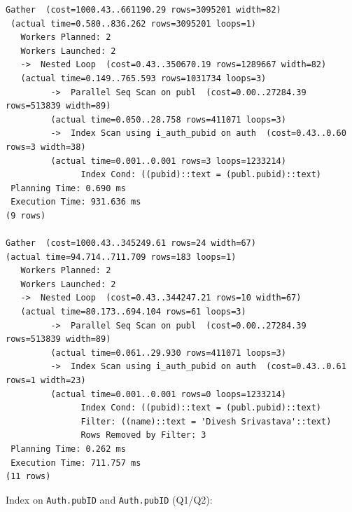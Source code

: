 \documentclass[11pt]{scrartcl}
\begin{document}
{\small
\parskip0pt\begin{verbatim}
Gather  (cost=1000.43..661190.29 rows=3095201 width=82) 
 (actual time=0.580..836.262 rows=3095201 loops=1)
   Workers Planned: 2
   Workers Launched: 2
   ->  Nested Loop  (cost=0.43..350670.19 rows=1289667 width=82) 
   (actual time=0.149..765.593 rows=1031734 loops=3)
         ->  Parallel Seq Scan on publ  (cost=0.00..27284.39 rows=513839 width=89) 
         (actual time=0.050..28.758 rows=411071 loops=3)
         ->  Index Scan using i_auth_pubid on auth  (cost=0.43..0.60 rows=3 width=38) 
         (actual time=0.001..0.001 rows=3 loops=1233214)
               Index Cond: ((pubid)::text = (publ.pubid)::text)
 Planning Time: 0.690 ms
 Execution Time: 931.636 ms
(9 rows)

Gather  (cost=1000.43..345249.61 rows=24 width=67) 
(actual time=94.714..711.709 rows=183 loops=1)
   Workers Planned: 2
   Workers Launched: 2
   ->  Nested Loop  (cost=0.43..344247.21 rows=10 width=67) 
   (actual time=80.173..694.104 rows=61 loops=3)
         ->  Parallel Seq Scan on publ  (cost=0.00..27284.39 rows=513839 width=89) 
         (actual time=0.061..29.930 rows=411071 loops=3)
         ->  Index Scan using i_auth_pubid on auth  (cost=0.43..0.61 rows=1 width=23) 
         (actual time=0.001..0.001 rows=0 loops=1233214)
               Index Cond: ((pubid)::text = (publ.pubid)::text)
               Filter: ((name)::text = 'Divesh Srivastava'::text)
               Rows Removed by Filter: 3
 Planning Time: 0.262 ms
 Execution Time: 711.757 ms
(11 rows)
\end{verbatim}}

Index on \texttt{Auth.pubID} and \texttt{Auth.pubID} (Q1/Q2):
\end{document}
